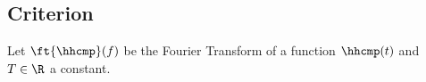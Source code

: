 \subsection{Criterion}
\begin{theorem}
\label{thm:mdb_zeroISI}
Let $\ft{\hhcmp}(f)$ be the Fourier Transform of a function
$\hhcmp(t)$ and $T\in\R$ a constant.
\end{theorem}
